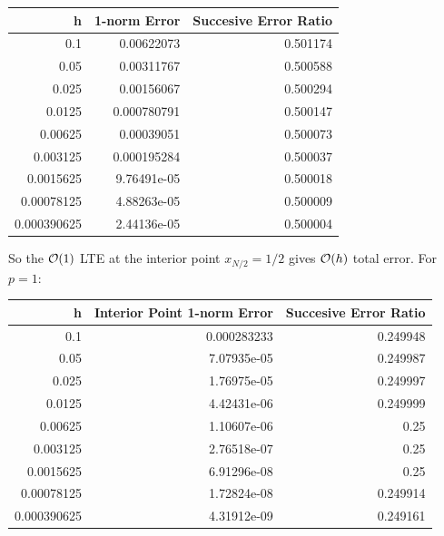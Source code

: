 \documentclass[12pt]{article}
\begin{document}
\begin{center}
\begin{tabular}{rrr}
\hline
    h &   1-norm Error &   Succesive Error Ratio \\
\hline
 0.1         &                   0.00622073  &                0.501174 \\
 0.05        &                   0.00311767  &                0.500588 \\
 0.025       &                   0.00156067  &                0.500294 \\
 0.0125      &                   0.000780791 &                0.500147 \\
 0.00625     &                   0.00039051  &                0.500073 \\
 0.003125    &                   0.000195284 &                0.500037 \\
 0.0015625   &                   9.76491e-05 &                0.500018 \\
 0.00078125  &                   4.88263e-05 &                0.500009 \\
 0.000390625 &                   2.44136e-05 &                0.500004 \\
\hline
\end{tabular}
\end{center}
So the $\order{1}$ LTE at the interior point $x_{N/2} = 1/2$ gives $\order{h}$ total error.  For $p=1$:
\begin{center}
\begin{tabular}{rrr}
\hline
    h &   Interior Point 1-norm Error &   Succesive Error Ratio \\
\hline
 0.1         &                   0.000283233 &                0.249948 \\
 0.05        &                   7.07935e-05 &                0.249987 \\
 0.025       &                   1.76975e-05 &                0.249997 \\
 0.0125      &                   4.42431e-06 &                0.249999 \\
 0.00625     &                   1.10607e-06 &                0.25     \\
 0.003125    &                   2.76518e-07 &                0.25     \\
 0.0015625   &                   6.91296e-08 &                0.25     \\
 0.00078125  &                   1.72824e-08 &                0.249914 \\
 0.000390625 &                   4.31912e-09 &                0.249161 \\
\hline
\end{tabular}
\end{center}
\end{document}
